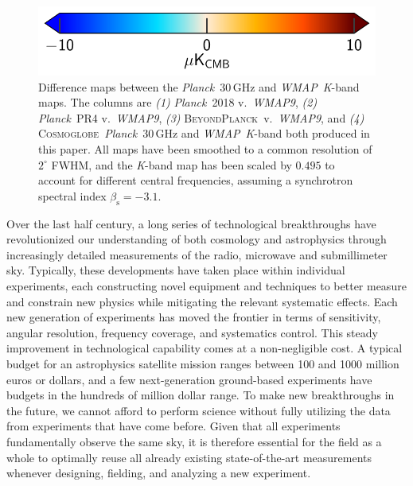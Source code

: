 \documentclass[twocolumn]{../../common/aa}
\def\WMAP{\emph{WMAP}}
\def\WMAPnine{\emph{WMAP9}}
\def\Planck{\emph{Planck}}
\newcommand{\BP}{\textsc{BeyondPlanck}}
\newcommand{\cosmoglobe}{\textsc{Cosmoglobe}}
\newcommand{\K}[0]{\textit K}
\begin{document}
\begin{figure}
        \hspace*{40mm}\includegraphics[width=0.25\textheight]{figures/cbar_10uK.pdf}
	\caption{Difference maps between the \Planck\ 30\,GHz and \WMAP\ \K-band maps. The columns are \textit{(1)} \Planck\ 2018 v.~\WMAPnine, \textit{(2)} \Planck\ PR4 v.~\WMAPnine, \textit{(3)} \BP\ v.~\WMAPnine, and \textit{(4)} \cosmoglobe\ \Planck\ 30\,GHz and \WMAP\ \K-band both produced in this paper. All maps have been smoothed to a common resolution of $2^\circ$ FWHM, and the \K-band map has been scaled by $0.495$ to account for different central frequencies, assuming a synchrotron spectral index $\beta_\mathrm s=-3.1$.}
	\label{fig:diff_history}
\end{figure}

Over the last half century, a long series of technological breakthroughs have revolutionized our understanding of both cosmology and astrophysics through increasingly detailed measurements of the radio, microwave and submillimeter sky. Typically, these developments have taken place within individual experiments, each constructing novel equipment and techniques to better measure and constrain new physics while mitigating the relevant systematic effects. Each new generation of experiments has moved the frontier in terms of sensitivity, angular resolution, frequency coverage, and systematics control. This steady improvement in technological capability comes at a non-negligible cost. A typical budget for an astrophysics satellite mission ranges between 100 and 1000 million euros or dollars, and a few next-generation ground-based experiments have budgets in the hundreds of million dollar range. To make new breakthroughs in the future, we cannot afford to perform science without fully utilizing the data from experiments that have come before.  Given that all experiments fundamentally observe the same sky, it is therefore essential for the field as a whole to optimally reuse all already existing state-of-the-art measurements whenever designing, fielding, and analyzing a new experiment.
\end{document}

